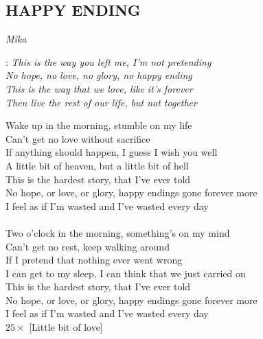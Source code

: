 \begin{flushleft}
	\section*{\Huge HAPPY ENDING}
	\emph{Mika}
\end{flushleft}

\textregistered:
\emph{
This is the way you left me, I'm not pretending\\
No hope, no love, no glory, no happy ending\\
This is the way that we love, like it's forever\\
Then live the rest of our life, but not together\\
}

Wake up in the morning, stumble on my life\\
Can't get no love without sacrifice\\
If anything should happen, I guess I wish you well\\
A little bit of heaven, but a little bit of hell\\

This is the hardest story, that I've ever told\\
No hope, or love, or glory, happy endings gone forever more\\
I feel as if I'm wasted and I've wasted every day\\
\textregistered\\

Two o'clock in the morning, something's on my mind\\
Can't get no rest, keep walking around\\
If I pretend that nothing ever went wrong\\
I can get to my sleep, I can think that we just carried on\\

This is the hardest story, that I've ever told\\
No hope, or love, or glory, happy endings gone forever more\\
I feel as if I'm wasted and I've wasted every day\\

\textregistered \hspace{1cm} $25 \times$ [Little bit of love] \hspace{1cm} \textregistered

\newpage
